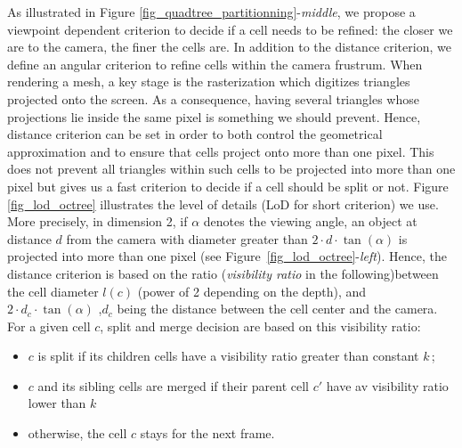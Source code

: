 \documentclass{llncs}
\begin{document}
As illustrated in Figure
\ref{fig_quadtree_partitionning}-\emph{middle}, we propose a viewpoint
dependent criterion to decide if a cell needs to be refined: the
closer we are to the camera, the finer the cells are. In addition to
the distance criterion, we define an angular criterion to refine cells
within the camera frustrum. When rendering a mesh, a key stage is the
rasterization which digitizes triangles projected onto the
screen. As a consequence, having several triangles whose projections
lie inside the same pixel is something we should prevent. Hence,
distance criterion can be set in order to both control the geometrical
approximation and to ensure that cells project onto more than one
pixel. This does not prevent all triangles within such cells to be
projected into more than one pixel but gives us a fast criterion to
decide if a cell should be split or not.  Figure \ref{fig_lod_octree}
illustrates the level of details (LoD for short criterion) we
use. More precisely, in dimension 2, if $\alpha$ denotes the viewing
angle, an object at distance $d$ from the camera with diameter greater than
 $2\cdot d\cdot\tan(\alpha)$
 is projected into more than one pixel
(see Figure~\ref{fig_lod_octree}-\emph{left}). Hence, the distance
criterion is based on the ratio (\emph{visibility ratio} in the
following)between the cell diameter $l(c)$ (power of 2 depending on
the depth), and 
$2\cdot d_c\cdot\tan(\alpha)$ 
,$d_c$ being the distance between the cell center and the camera. For a given cell $c$,
split and merge decision are based on this visibility ratio:
\begin{itemize}
\item $c$ is split if its children cells have a visibility ratio
  greater than  constant $k$\,;
\item $c$ and its sibling cells are merged if their parent cell $c'$
  have av visibility ratio lower than $k$\;
\item otherwise, the cell $c$ stays for the next frame.
\end{itemize}
%
\end{document}
